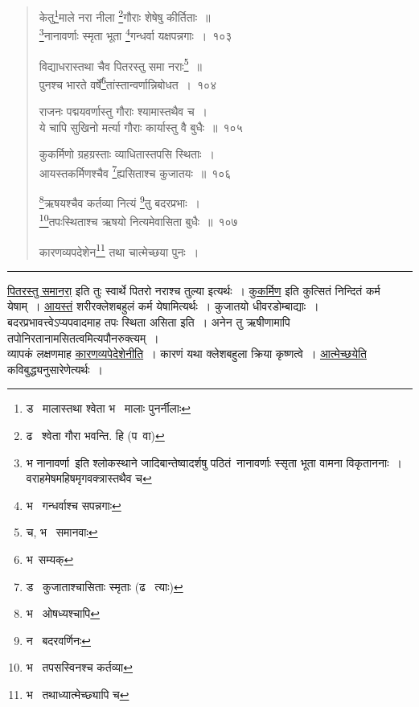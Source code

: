\documentclass[11pt, openany]{book}
\begin{document}
\begin{quote}
{\na केतु\renewcommand{\thefootnote}{1}\footnote{ड \textendash\ मालास्तथा श्वेता भ \textendash\ मालाः पुनर्नीलाः}माले नरा नीला \renewcommand{\thefootnote}{2}\footnote{ढ \textendash\ श्वेता गौरा भवन्ति. हि (प\textendash\ वा)}गौराः शेषेषु कीर्तिताः~॥\\
\renewcommand{\thefootnote}{3}\footnote{भ नानावर्णा\textendash\ इति श्लोकस्थाने जादिबान्तेष्वादर्शषु पठितं\textendash\ {\qt नानावर्णाः स्सृता भूता वामना विकृताननाः~। वराहमेषमहिषमृगवक्त्रास्तथैव च}}नानावर्णाः स्मृता भूता \renewcommand{\thefootnote}{4}\footnote{भ \textendash\ गन्धर्वाश्च सपन्नगाः}गन्धर्वा यक्षपन्नगाः~।~१०३

विद्याधरास्तथा चैव पितरस्तु समा नराः\renewcommand{\thefootnote}{5}\footnote{च, भ \textendash\ समानवाः}~॥\\
पुनश्च भारते वर्षे॑\renewcommand{\thefootnote}{6}\footnote{भ\textendash\ सम्यक्}तांस्तान्वर्णान्निबोधत~।~१०४

राजनः पद्मयवर्णास्तु गौराः श्यामास्तथैव च~।\\
ये चापि सुखिनो मर्त्या गौराः कार्यास्तु वै बुधैः~॥~१०५

कुकर्मिणो ग्रहग्रस्ताः व्याधितास्तपसि स्थिताः~।\\
आयस्तकर्मिणश्चैव \renewcommand{\thefootnote}{7}\footnote{ड \textendash\ कुजाताश्चासिताः स्मृताः (ढ \textendash\ त्याः)}ह्यसिताश्च कुजातयः~॥~१०६

\renewcommand{\thefootnote}{8}\footnote{भ \textendash\ ओषध्यश्चापि}ऋषयश्चैव कर्तव्या नित्यं \renewcommand{\thefootnote}{9}\footnote{न \textendash\ बदरवर्णिनः}तु बदरप्रभाः~।\\
\renewcommand{\thefootnote}{10}\footnote{भ \textendash\ तपसस्विनश्च कर्तव्या}तपःस्थिताश्च ऋषयो नित्यमेवासिता बुधैः~॥~१०७

कारणव्यपदेशेन\renewcommand{\thefootnote}{11}\footnote{भ \textendash\ तथाध्यात्मेच्छ्यापि च} तथा चात्मेच्छया पुनः~।}
\end{quote}

\hrule

\vspace{2mm}
\noindent 
\underline{पितरस्तु समानरा॒} इति तुः स्वार्थे पितरो नराश्च तुल्या इत्यर्थः~। \underline{कुकर्मिण} इति कुत्सितं निन्दितं कर्म येषाम्~। \underline{आयस्तं} शरीरक्लेशबहुलं कर्म येषामित्यर्थः~। कुजातयो धीवरडोम्बाद्याः~। बदरप्रभावत्त्वेऽप्यपवादमाह तपः स्थिता असिता इति~। अनेन तु ऋषीणामापि तपोनिरतानामसितत्वमित्यपौनरुक्त्यम्~।\\

व्यापकं लक्षणमाह \underline{कारणव्यपेदेशेनीति}~। कारणं यथा क्लेशबहुला क्रिया कृष्णत्वे~। \underline{आत्मेच्छयेति} कविबुद्ध्यनुसारेणेत्यर्थः~।
\end{document}
